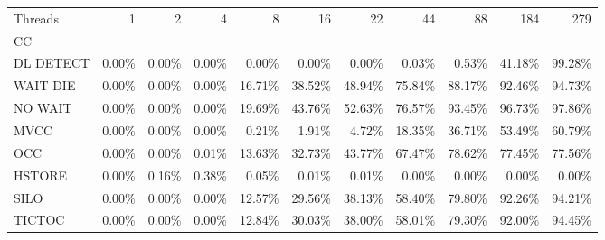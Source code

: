\begin{tabular}{lrrrrrrrrrr}
\toprule
Threads &   1   &   2   &   4   &    8   &    16  &    22  &    44  &    88  &    184 &    279 \\
CC        &       &       &       &        &        &        &        &        &        &        \\
\midrule
DL DETECT & 0.00\% & 0.00\% & 0.00\% &  0.00\% &  0.00\% &  0.00\% &  0.03\% &  0.53\% & 41.18\% & 99.28\% \\
WAIT DIE  & 0.00\% & 0.00\% & 0.00\% & 16.71\% & 38.52\% & 48.94\% & 75.84\% & 88.17\% & 92.46\% & 94.73\% \\
NO WAIT   & 0.00\% & 0.00\% & 0.00\% & 19.69\% & 43.76\% & 52.63\% & 76.57\% & 93.45\% & 96.73\% & 97.86\% \\
MVCC      & 0.00\% & 0.00\% & 0.00\% &  0.21\% &  1.91\% &  4.72\% & 18.35\% & 36.71\% & 53.49\% & 60.79\% \\
OCC       & 0.00\% & 0.00\% & 0.01\% & 13.63\% & 32.73\% & 43.77\% & 67.47\% & 78.62\% & 77.45\% & 77.56\% \\
HSTORE    & 0.00\% & 0.16\% & 0.38\% &  0.05\% &  0.01\% &  0.01\% &  0.00\% &  0.00\% &  0.00\% &  0.00\% \\
SILO      & 0.00\% & 0.00\% & 0.00\% & 12.57\% & 29.56\% & 38.13\% & 58.40\% & 79.80\% & 92.26\% & 94.21\% \\
TICTOC    & 0.00\% & 0.00\% & 0.00\% & 12.84\% & 30.03\% & 38.00\% & 58.01\% & 79.30\% & 92.00\% & 94.45\% \\
\bottomrule
\end{tabular}
